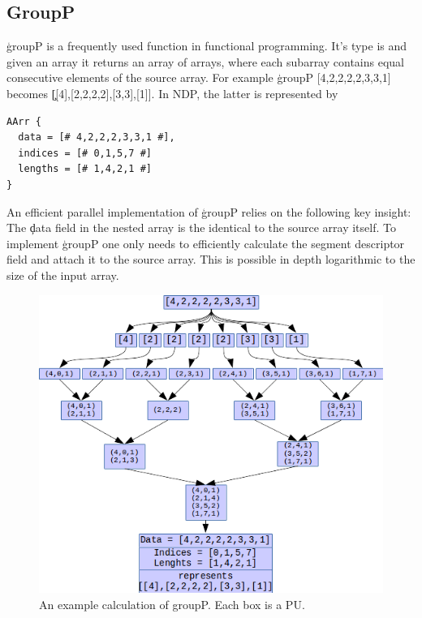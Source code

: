   \subsection*{GroupP}
    \c{groupP} is a frequently used function in functional programming.
    It's type is \type{[:a:] -> [:[:a:]:]} and given an array it returns an array of arrays,
    where each subarray contains equal consecutive
    elements of the source array. For example
    \c{groupP [4,2,2,2,2,3,3,1]} becomes \c{[[4],[2,2,2,2],[3,3],[1]]}.
    In NDP, the latter is represented by
    \begin{lstlisting}
AArr {
  data = [# 4,2,2,2,3,3,1 #],
  indices = [# 0,1,5,7 #]
  lengths = [# 1,4,2,1 #]
}
    \end{lstlisting}
    An efficient parallel implementation of \c{groupP}
    relies on the following key insight: The \c{data} field in the nested array
    is the identical to the source array itself. To implement \c{groupP} one only
    needs to efficiently calculate the segment descriptor field
    and attach it to the source array. This is
    possible in depth logarithmic to the size of the input array.
    
    \begin{figure}[h!]
        \begin{center}
        \includegraphics[width=\linewidth]{groupP.png}
        \caption[Parallel Evaluation of \c{groupP}]{An example calculation of groupP. Each box is a PU.}
        \label{figure:groupP}
        \end{center}
    \end{figure}
    
